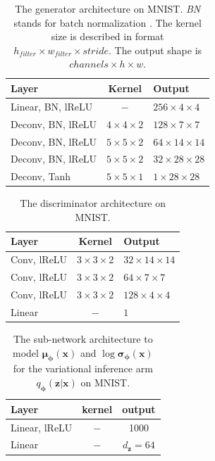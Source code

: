 \documentclass[letterpaper]{article} %
\newcommand{\xv}[0]{\ensuremath{\boldsymbol{x}} }
\newcommand{\zv}[0]{\ensuremath{\boldsymbol{z}} }
\newcommand{\muv}[0]{\ensuremath{\boldsymbol{\mu}} }
\newcommand{\sigmav}[0]{\ensuremath{\boldsymbol{\sigma}} }
\newcommand{\phiv}[0]{\ensuremath{\boldsymbol{\phi}} }
\begin{document}
\begin{table}[H]\centering
	\caption{The generator architecture on MNIST. 
		\emph{BN} stands for batch normalization \cite{ioffe2015batch}. 
		The kernel size is described in format
		$h_{filter} \times w_{filter} \times stride$. The output shape is $channels \times h \times w$.}\label{tab:network_MNIST_G}
	\begin{tabular}{lcl} \hline\hline
		Layer              & Kernel             & Output \\ \hline
		Linear, BN, lReLU  & $-$                & $256\times4\times4$  \\ \hline
		Deconv, BN, lReLU  & $4\times4\times2$  & $128\times7\times7$  \\ \hline
		Deconv, BN, lReLU  & $5\times5\times2$  & $64\times14\times14$ \\ \hline
		Deconv, BN, lReLU  & $5\times5\times2$  & $32\times28\times28$ \\ \hline
		Deconv, Tanh       & $5\times5\times1$  & $1\times28\times28$ \\ \hline\hline
	\end{tabular}
\end{table}

\begin{table}[H]\centering
	\caption{The discriminator architecture on MNIST.}\label{tab:network_MNIST_D}
	\begin{tabular}{lcl}\hline\hline
		Layer              & Kernel               & Output               \\ \hline
		Conv, lReLU        & $3\times3\times2$ & $32\times14\times14$ \\ \hline
		Conv, lReLU & $3\times3\times2$ & $64\times7\times7$ \\ \hline
		Conv, lReLU & $3\times3\times2$ & $128\times4\times4$ \\ \hline
		Linear      & $-$               & $1$\\ \hline\hline
	\end{tabular}
\end{table}


\begin{table}[H]\centering
	\caption{The sub-network architecture to model $\muv_{\phiv}(\xv)$ and $\log \sigmav_{\phiv}(\xv)$ for the variational inference arm $q_{\phiv}(\zv|\xv)$ on MNIST.}\label{tab:sub_q_mnist}
	\begin{tabular}{lcc}\hline\hline
		Layer               & kernel      & output        \\ \hline
		Linear, lReLU       & $-$         & 1000          \\ \hline
		Linear              & $-$         &  $d_{\zv}=64$        \\ \hline\hline
	\end{tabular}
\end{table}
\end{document}
